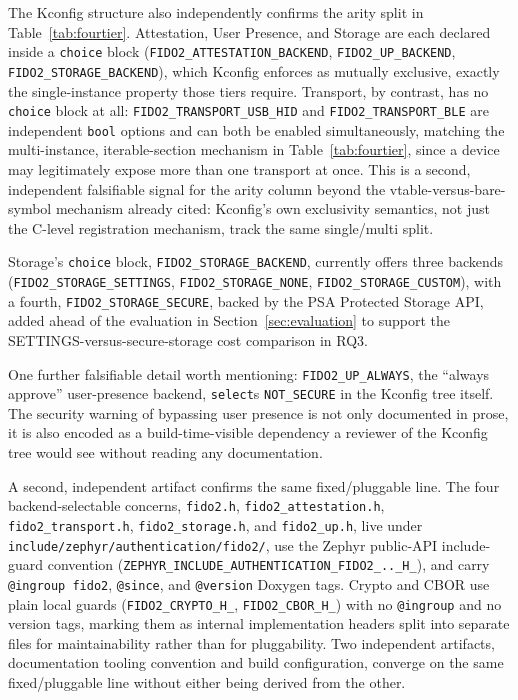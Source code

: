 The Kconfig structure also independently confirms the arity split in Table~\ref{tab:fourtier}. Attestation, User Presence, and Storage are each declared inside a \texttt{choice} block (\texttt{FIDO2\_ATTESTATION\_BACKEND}, \texttt{FIDO2\_UP\_BACKEND}, \texttt{FIDO2\_STORAGE\_BACKEND}), which Kconfig enforces as mutually exclusive, exactly the single-instance property those tiers require. Transport, by contrast, has no \texttt{choice} block at all: \texttt{FIDO2\_TRANSPORT\_USB\_HID} and \texttt{FIDO2\_TRANSPORT\_BLE} are independent \texttt{bool} options and can both be enabled simultaneously, matching the multi-instance, iterable-section mechanism in Table~\ref{tab:fourtier}, since a device may legitimately expose more than one transport at once. This is a second, independent falsifiable signal for the arity column beyond the vtable-versus-bare-symbol mechanism already cited: Kconfig's own exclusivity semantics, not just the C-level registration mechanism, track the same single/multi split.

Storage's \texttt{choice} block, \texttt{FIDO2\_STORAGE\_BACKEND}, currently offers three backends (\texttt{FIDO2\_STORAGE\_SETTINGS}, \texttt{FIDO2\_STORAGE\_NONE}, \texttt{FIDO2\_STORAGE\_CUSTOM}), with a fourth, \texttt{FIDO2\_STORAGE\_SECURE}, backed by the PSA Protected Storage API, added ahead of the evaluation in Section~\ref{sec:evaluation} to support the SETTINGS-versus-secure-storage cost comparison in RQ3.

One further falsifiable detail worth mentioning: \texttt{FIDO2\_UP\_ALWAYS}, the ``always approve'' user-presence backend, \texttt{select}s \texttt{NOT\_SECURE} in the Kconfig tree itself. The security warning of bypassing user presence is not only documented in prose, it is also encoded as a build-time-visible dependency a reviewer of the Kconfig tree would see without reading any documentation.

A second, independent artifact confirms the same fixed/pluggable line. The four backend-selectable concerns, \texttt{fido2.h}, \texttt{fido2\_attestation.h}, \texttt{fido2\_transport.h}, \texttt{fido2\_storage.h}, and \texttt{fido2\_up.h}, live under \texttt{include/zephyr/authentication/fido2/}, use the Zephyr public-API include-guard convention (\texttt{ZEPHYR\_INCLUDE\_AUTHENTICATION\_FIDO2\_..\_H\_}), and carry \texttt{@ingroup fido2}, \texttt{@since}, and \texttt{@version} Doxygen tags. Crypto and CBOR use plain local guards (\texttt{FIDO2\_CRYPTO\_H\_}, \texttt{FIDO2\_CBOR\_H\_}) with no \texttt{@ingroup} and no version tags, marking them as internal implementation headers split into separate files for maintainability rather than for pluggability. Two independent artifacts, documentation tooling convention and build configuration, converge on the same fixed/pluggable line without either being derived from the other.

